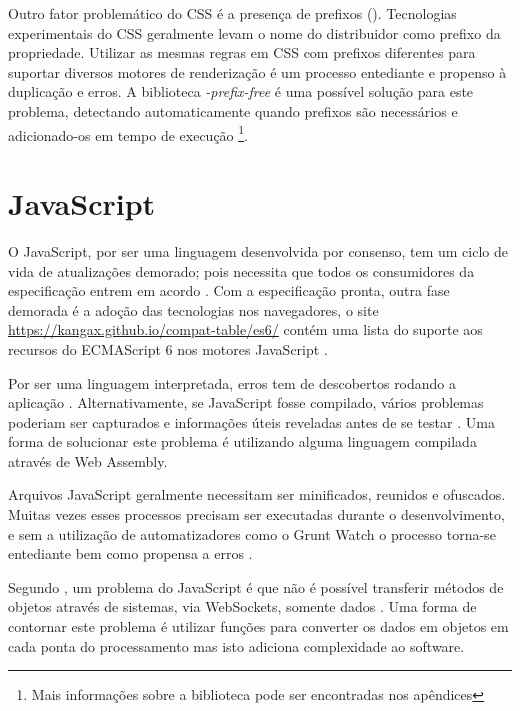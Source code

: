 Outro fator problemático do CSS é a presença de prefixos
(). Tecnologias experimentais do CSS geralmente
levam o nome do distribuidor como prefixo da propriedade. Utilizar as
mesmas regras em CSS com prefixos diferentes para suportar diversos
motores de renderização é um processo entediante e propenso à
duplicação e erros. A biblioteca \textit{-prefix-free} é uma
possível solução para este problema, detectando automaticamente
quando prefixos são necessários e adicionado-os em tempo de execução
\footnote{Mais informações sobre a biblioteca pode ser encontradas nos
apêndices}.

\section{JavaScript}

O JavaScript, por ser uma linguagem desenvolvida por consenso, tem um
ciclo de vida de atualizações demorado; pois necessita que todos os
consumidores da especificação entrem em acordo . Com a especificação
pronta, outra fase demorada é a adoção das tecnologias nos
navegadores, o site \url{https://kangax.github.io/compat-table/es6/}
contém uma lista do suporte aos recursos do ECMAScript 6 nos motores
JavaScript .

Por ser uma linguagem interpretada, erros tem de descobertos rodando a
aplicação . Alternativamente,
se JavaScript fosse compilado, vários problemas poderiam ser capturados
e informações úteis reveladas antes de se testar \autocite[p.
12]{viabilityBusinessApplications}. Uma forma de solucionar 
este problema é utilizando alguma linguagem compilada através de 
Web Assembly.

Arquivos JavaScript geralmente necessitam ser minificados, reunidos e
ofuscados. Muitas vezes esses processos precisam ser executadas durante
o desenvolvimento, e sem a utilização de automatizadores como o Grunt
Watch o processo torna-se entediante bem como propensa a erros .

Segundo \citet{htmlResearchJournal}, um problema do JavaScript é que
não é possível transferir métodos de objetos através de sistemas,
via WebSockets, somente dados .
Uma forma de contornar este problema é utilizar funções para
converter os dados em objetos em cada ponta do processamento mas isto
adiciona complexidade ao software.

